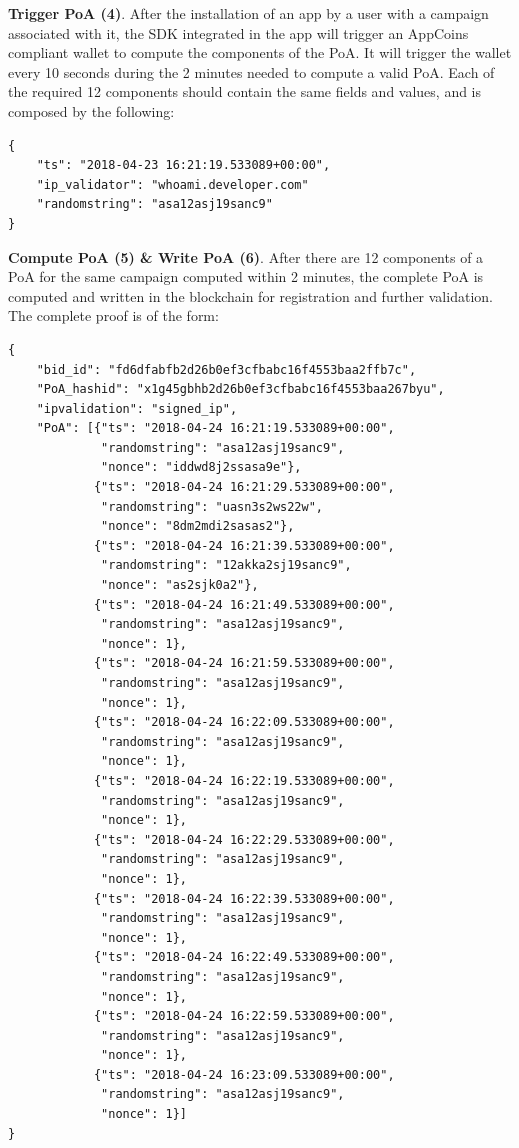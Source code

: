 \noindent \textbf{Trigger \textsf{PoA} (4)}. After the installation of an app by a user with a campaign associated with it, the SDK integrated in the app will trigger an AppCoins compliant wallet to compute the components of the \textsf{PoA}. It will trigger the wallet every 10 seconds during the 2 minutes needed to compute a valid \textsf{PoA}. Each of the required 12 components should contain the same fields and values, and is composed by the following:
\begin{tcolorbox}[enhanced jigsaw,sharp corners, drop fuzzy shadow=ShadowColor]
\begin{lstlisting}[xleftmargin=0.05\textwidth]
{
    "ts": "2018-04-23 16:21:19.533089+00:00",
    "ip_validator": "whoami.developer.com"
    "randomstring": "asa12asj19sanc9"
}
\end{lstlisting}
\end{tcolorbox}

\noindent \textbf{Compute \textsf{PoA} (5) \& Write \textsf{PoA} (6)}. After there are 12 components of a \textsf{PoA} for the same campaign computed within 2 minutes, the complete \textsf{PoA} is computed and written in the blockchain for registration and further validation. The complete proof is of the form:
\begin{tcolorbox}[enhanced jigsaw,sharp corners, drop fuzzy shadow=ShadowColor]
\begin{lstlisting}[xleftmargin=0.05\textwidth]
{
    "bid_id": "fd6dfabfb2d26b0ef3cfbabc16f4553baa2ffb7c",
    "PoA_hashid": "x1g45gbhb2d26b0ef3cfbabc16f4553baa267byu",
    "ipvalidation": "signed_ip",
    "PoA": [{"ts": "2018-04-24 16:21:19.533089+00:00",
             "randomstring": "asa12asj19sanc9",
             "nonce": "iddwd8j2ssasa9e"},
            {"ts": "2018-04-24 16:21:29.533089+00:00",
             "randomstring": "uasn3s2ws22w",
             "nonce": "8dm2mdi2sasas2"},
            {"ts": "2018-04-24 16:21:39.533089+00:00",
             "randomstring": "12akka2sj19sanc9",
             "nonce": "as2sjk0a2"},
            {"ts": "2018-04-24 16:21:49.533089+00:00",
             "randomstring": "asa12asj19sanc9",
             "nonce": 1},
            {"ts": "2018-04-24 16:21:59.533089+00:00",
             "randomstring": "asa12asj19sanc9",
             "nonce": 1},
            {"ts": "2018-04-24 16:22:09.533089+00:00",
             "randomstring": "asa12asj19sanc9",
             "nonce": 1},
            {"ts": "2018-04-24 16:22:19.533089+00:00",
             "randomstring": "asa12asj19sanc9",
             "nonce": 1},
            {"ts": "2018-04-24 16:22:29.533089+00:00",
             "randomstring": "asa12asj19sanc9",
             "nonce": 1},
            {"ts": "2018-04-24 16:22:39.533089+00:00",
             "randomstring": "asa12asj19sanc9",
             "nonce": 1},
            {"ts": "2018-04-24 16:22:49.533089+00:00",
             "randomstring": "asa12asj19sanc9",
             "nonce": 1},
            {"ts": "2018-04-24 16:22:59.533089+00:00",
             "randomstring": "asa12asj19sanc9",
             "nonce": 1},
            {"ts": "2018-04-24 16:23:09.533089+00:00",
             "randomstring": "asa12asj19sanc9",
             "nonce": 1}]
}
\end{lstlisting}
\end{tcolorbox}
\pagebreak

